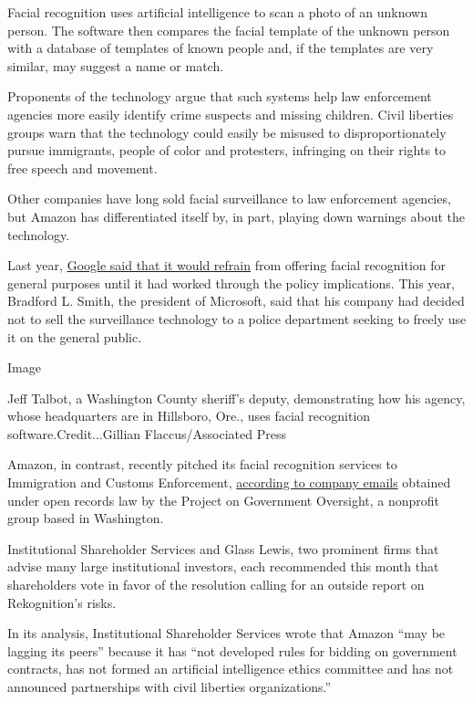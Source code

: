 Facial recognition uses artificial intelligence to scan a photo of an
unknown person. The software then compares the facial template of the
unknown person with a database of templates of known people and, if the
templates are very similar, may suggest a name or match.

Proponents of the technology argue that such systems help law
enforcement agencies more easily identify crime suspects and missing
children. Civil liberties groups warn that the technology could easily
be misused to disproportionately pursue immigrants, people of color and
protesters, infringing on their rights to free speech and movement.

Other companies have long sold facial surveillance to law enforcement
agencies, but Amazon has differentiated itself by, in part, playing down
warnings about the technology.

Last year,
\href{https://www.blog.google/around-the-globe/google-asia/ai-social-good-asia-pacific/}{Google
said that it would refrain} from offering facial recognition for general
purposes until it had worked through the policy implications. This year,
Bradford L. Smith, the president of Microsoft, said that his company had
decided not to sell the surveillance technology to a police department
seeking to freely use it on the general public.

Image

Jeff Talbot, a Washington County sheriff's deputy, demonstrating how his
agency, whose headquarters are in Hillsboro, Ore., uses facial
recognition software.Credit...Gillian Flaccus/Associated Press

Amazon, in contrast, recently pitched its facial recognition services to
Immigration and Customs Enforcement,
\href{https://www.documentcloud.org/documents/5014186-Amazon-ICE-emails-FOIA.html}{according
to company emails} obtained under open records law by the Project on
Government Oversight, a nonprofit group based in Washington.

Institutional Shareholder Services and Glass Lewis, two prominent firms
that advise many large institutional investors, each recommended this
month that shareholders vote in favor of the resolution calling for an
outside report on Rekognition's risks.

In its analysis, Institutional Shareholder Services wrote that Amazon
``may be lagging its peers'' because it has ``not developed rules for
bidding on government contracts, has not formed an artificial
intelligence ethics committee and has not announced partnerships with
civil liberties organizations.''


